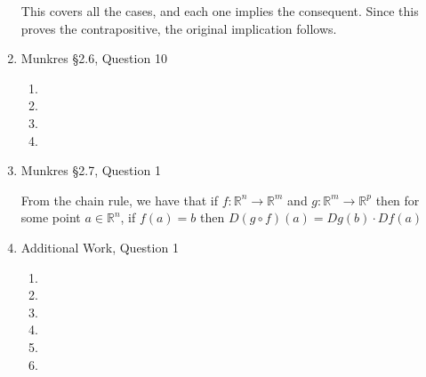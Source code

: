 \documentclass[letterpaper,10pt]{article}
\begin{document}
\begin{enumerate}
	This covers all the cases, and each one implies the consequent. Since this proves the contrapositive, the original implication follows.

	\item Munkres \S 2.6, Question 10

	\begin{enumerate}
		\item 
		\item 
		\item 
		\item 
	\end{enumerate}

	\item Munkres \S 2.7, Question 1

	From the chain rule, we have that if $f : \mathbb{R}^n \to \mathbb{R}^m$ and $g : \mathbb{R}^m \to \mathbb{R}^p$ then for some point $a \in \mathbb{R}^n$, if $f(a) = b$ then $D(g \circ f)(a) = Dg(b) \cdot Df(a)$

	\item Additional Work, Question 1

	\begin{enumerate}
		\item 
		\item 
		\item 
		\item 
		\item 
		\item 
	\end{enumerate}


\end{enumerate}
\end{document}
